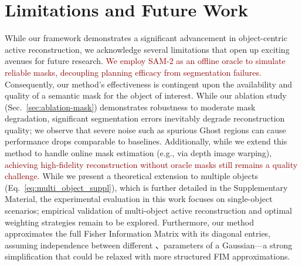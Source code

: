 \documentclass{egpubl}
\newcommand{\rev}[1]{\textcolor{darkred}{#1}}
\newcommand{\tim}[1]{{\color[rgb]{0.8,0.2,0} Tim: #1}}
\begin{document}


\vspace{-2mm}
\section{Limitations and Future Work}
\label{sec:limitations}

While our framework demonstrates a significant advancement in object-centric active reconstruction, we acknowledge several limitations that open up exciting avenues for future research. 
\rev{We employ SAM-2 as an offline oracle to simulate reliable masks, decoupling planning efficacy from segmentation failures.}
Consequently, our method's effectiveness is contingent upon the availability and quality of a semantic mask for the object of interest. While our ablation study (Sec.~\ref{sec:ablation-mask}) demonstrates robustness to moderate mask degradation, significant segmentation errors inevitably degrade reconstruction quality; we observe that severe noise such as spurious Ghost regions can cause performance drops comparable to baselines. Additionally, while we extend this method to handle online mask estimation (e.g., via depth image warping), \rev{achieving high-fidelity reconstruction without oracle masks still remains a quality challenge.} While we present a theoretical extension to multiple objects (Eq.~\ref{eq:multi_object_suppl}), which is further detailed in the Supplementary Material, the experimental evaluation in this work focuses on single-object scenarios; empirical validation of multi-object active reconstruction and optimal weighting strategies remain to be explored. Furthermore, our method approximates the full Fisher Information Matrix with its diagonal entries, assuming independence between different 、parameters of a Gaussian—a strong simplification that could be relaxed with more structured FIM approximations.


\vspace{-3mm}
\end{document}
